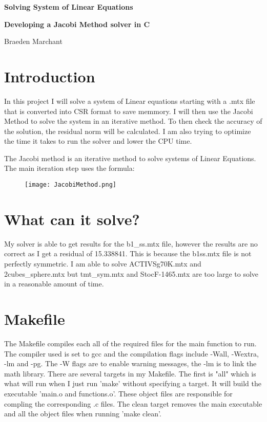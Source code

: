 \documentclass[12pt]{article}
\begin{document}
	
	\justifying
	
	\begin{center}
		\textbf{{\large Solving System of Linear Equations}}
		
		\textbf{Developing a Jacobi Method solver in C} 
		
		Braeden Marchant
	\end{center}
	

	
	
	
	\section{Introduction}
	In this project I will solve a system of Linear equations starting with a .mtx file that is converted into CSR format to save memmory. 
	I will then use the Jacobi Method to solve the system in an iterative method. To then check the accuracy of the solution, the residual norm will be calculated.
	I am also trying to optimize the time it takes to run the solver and lower the CPU time.

	The Jacobi method is an iterative method to solve systems of Linear Equations.
	The main iteration step uses the formula:
	\begin{figure}[H]
	\centering
	\texttt{[image: JacobiMethod.png]}
	\end{figure}

	\section{What can it solve?}
	My solver is able to get results for the b1\_ss.mtx file, however the results are no correct as I get a residual of 15.338841. 
	This is because the b1ss.mtx file is not perfectly symmetric.
	I am able to solve ACTIVSg70K.mtx and 2cubes\_sphere.mtx but tmt\_sym.mtx and StocF-1465.mtx are too large to solve in a reasonable amount of time.
	
	\section{Makefile}

    The Makefile compiles each all of the required files for the main function to run.
    The compiler used is set to gcc and the compilation flags include -Wall, -Wextra, -lm and -pg. The -W flags are to enable warning messages, the -lm is to link the math library. 
    There are several targets in my Makefile. The first is "all" which is what will run when I just run 'make' without specifying a target. It will build the executable 'main.o and functions.o'.
    These object files are responsible for compling the corresponding .c files.
    The clean target removes the main executable and all the object files when running 'make clean'.
\end{document}

